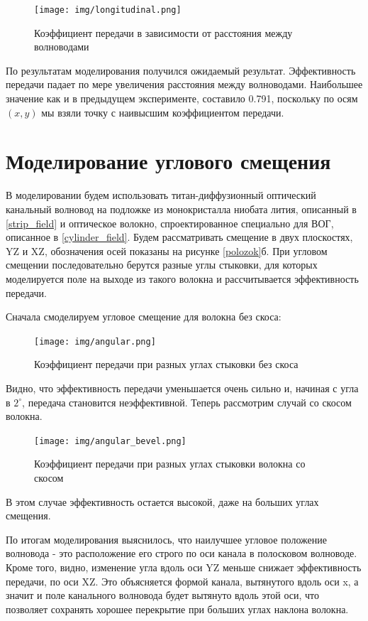 \begin{figure}[h!]
	\texttt{[image: img/longitudinal.png]}
	\caption{Коэффициент передачи в зависимости от расстояния между волноводами}
	\label{longitudinal}
\end{figure}

По результатам моделирования получился ожидаемый результат. Эффективность передачи падает по мере увеличения расстояния между волноводами. Наибольшее значение как и в предыдущем эксперименте, составило 0.791, поскольку по осям $(x,y)$ мы взяли точку с наивысшим коэффициентом передачи.   

\section{Моделирование углового смещения}

В моделировании будем использовать титан-диффузионный оптический канальный волновод на подложке из монокристалла ниобата лития, описанный в \ref{strip_field} и оптическое волокно, спроектированное специально для ВОГ, описанное в \ref{cylinder_field}. Будем рассматривать смещение в двух плоскостях, YZ и XZ, обозначения осей показаны на рисунке \ref{polozok}б. При угловом смещении последовательно берутся разные углы стыковки, для которых моделируется поле на выходе из такого волокна и рассчитывается эффективность передачи. 

Сначала смоделируем угловое смещение для волокна без скоса:

\begin{figure}[h!]
	\texttt{[image: img/angular.png]}
	\caption{Коэффициент передачи при разных углах стыковки без скоса}
	\label{angular}
\end{figure}
Видно, что эффективность передачи уменьшается очень сильно и, начиная с угла в $2^\circ$, передача становится неэффективной. Теперь рассмотрим случай со скосом волокна.

\begin{figure}[h!]
	\texttt{[image: img/angular\_bevel.png]}
	\caption{Коэффициент передачи при разных углах стыковки волокна со скосом}
	\label{angular_bevel}
\end{figure}
В этом случае эффективность остается высокой, даже на больших углах смещения.

По итогам моделирования выяснилось, что наилучшее угловое положение волновода - это расположение его строго по оси канала в полосковом волноводе. Кроме того, видно, изменение угла вдоль оси YZ меньше снижает эффективность передачи, по оси XZ. Это объясняется формой канала, вытянутого вдоль оси x, а значит и поле канального волновода будет вытянуто вдоль этой оси, что позволяет сохранять хорошее перекрытие при больших углах наклона волокна.
